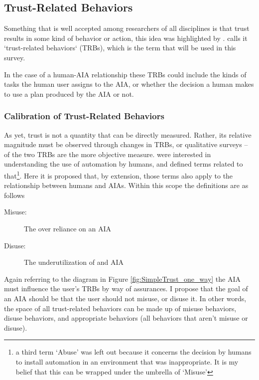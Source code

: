 \subsection{Trust-Related Behaviors} \label{sec:trbs}
Something that is well accepted among researchers of all disciplines is that trust results in some kind of behavior or action, this idea was highlighted by \citet{Lewis1985-pr}.  \citet{McKnight2001-fa} calls it `trust-related behaviors` (TRBs), which is the term that will be used in this survey.

In the case of a human-AIA relationship these TRBs could include the kinds of tasks the human user assigns to the AIA, or whether the decision a human makes to use a plan produced by the AIA or not. 

\subsubsection{Calibration of Trust-Related Behaviors}
    As yet, trust is not a quantity that can be directly measured. Rather, its relative magnitude must be observed through changes in TRBs, or qualitative surveys -- of the two TRBs are the more objective measure. \citet{Parasuraman1997-co} were interested in understanding the use of automation by humans, and defined terms related to that\footnote{a third term `Abuse' was left out because it concerns the decision by humans to install automation in an environment that was inappropriate. It is my belief that this can be wrapped under the umbrella of `Misuse'}. Here it is proposed that, by extension, those terms also apply to the relationship between humans and AIAs. Within this scope the definitions are as follows
    
    \begin{description}
        \item [Misuse:] The over reliance on an AIA
        \item [Disuse:] The underutilization of and AIA
    \end{description}

    Again referring to the diagram in Figure \ref{fig:SimpleTrust_one_way} the AIA must influence the user's TRBs by way of assurances. I propose that the goal of an AIA should be that the user should not misuse, or disuse it. In other words, the space of all trust-related behaviors can be made up of misuse behaviors, disuse behaviors, and appropriate behaviors (all behaviors that aren't misuse or disuse).
    

